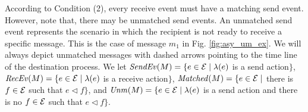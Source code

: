 According to Condition (2), every receive event must have a matching send event. However, note that, there may be unmatched send events. An unmatched send event represents the scenario in which the recipient is not ready to receive a specific message. This is the case of message $m_1 $ in  Fig. \ref{fig:asy_um_ex}.
We will always depict unmatched messages with dashed arrows pointing to the time line of the
destination process.
We let
$\mathit{SendEv}(M) = \{e \in \mathcal{E} \mid \lambda(e)$ is a send
action$\}$,
$\mathit{RecEv}(M) = \{e \in \mathcal{E} \mid \lambda(e)$ is a receive
action$\}$,
$\mathit{Matched}(M) = \{e \in \mathcal{E} \mid$ there is $f \in \mathcal{E}$
such that $e \lhd f\}$, and
$\mathit{Unm}(M) = \{e \in \mathcal{E} \mid \lambda(e)$ is a send
action and there is no $f \in \mathcal{E}$ such that $e \lhd f\}$.
%

